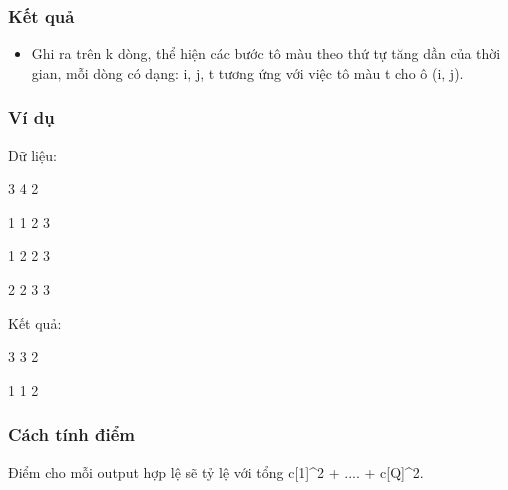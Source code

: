 \subsubsection{Kết quả}
\begin{itemize}
	\item Ghi ra trên k dòng, thể    hiện các bước tô màu theo thứ tự tăng dần của thời    gian, mỗi dòng có dạng: i, j, t tương ứng với việc tô    màu t cho ô (i, j).
\end{itemize}

\subsubsection{Ví dụ}

Dữ liệu:

3 4 2

1 1 2 3

1 2 2 3

2 2 3 3

Kết quả:

3 3 2

1 1 2

\subsubsection{Cách tính điểm}

Điểm cho mỗi output hợp lệ  sẽ tỷ lệ với tổng c[1]\textasciicircum2 + .... + c[Q]\textasciicircum2.

